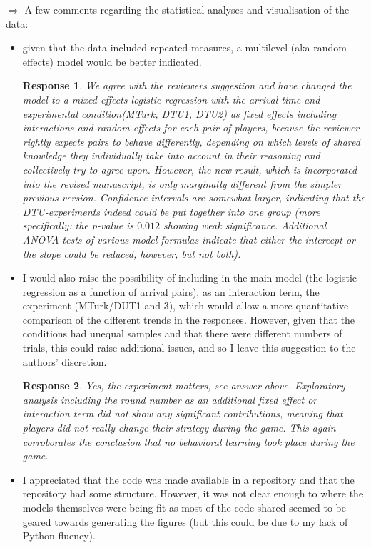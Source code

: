 \documentclass[a4paper]{article}
\newtheorem{response}{Response}
\begin{document}
$\Rightarrow$ A few comments regarding the statistical analyses and visualisation of the data:
\begin{itemize}
\item given that the data included repeated measures, a multilevel (aka random effects) model would be better indicated. 
\begin{response} We agree with the reviewers suggestion and have changed the model to a mixed effects logistic regression with the arrival time and experimental condition(MTurk, DTU1, DTU2) as fixed effects including interactions and random effects for each pair of players, because the reviewer rightly expects pairs to behave differently, depending on which levels of shared knowledge they individually take into account in their reasoning and collectively try to agree upon. However, the new result, which is incorporated into the revised manuscript, is only marginally different from the simpler previous version. Confidence intervals are somewhat larger, indicating that the DTU-experiments indeed could be put together into one group (more specifically: the p-value is $0.012$ showing weak significance. Additional ANOVA tests of various model formulas indicate that either the intercept or the slope could be reduced, however, but not both). \end{response}
\item I would also raise the possibility of including in the main model (the logistic regression as a function of arrival pairs), as an interaction term, the experiment (MTurk/DUT1 and 3), which would allow a more quantitative comparison of the different trends in the responses. However, given that the conditions had unequal samples and that there were different numbers of trials, this could raise additional issues, and so I leave this suggestion to the authors' discretion. 
\begin{response} Yes, the experiment matters, see answer above. Exploratory analysis including the round number as an additional fixed effect or interaction term did not show any significant contributions, meaning that players did not really change their strategy during the game. This again corroborates the conclusion that no behavioral learning took place during the game.\end{response}

\item I appreciated that the code was made available in a repository and that the repository had some structure. However, it was not clear enough to where the models themselves were being fit as most of the code shared seemed to be geared towards generating the figures (but this could be due to my lack of Python fluency). 


\end{itemize}
\end{document}
